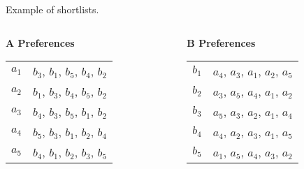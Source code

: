 \documentclass[aspectratio=169,xcolor=dvipsnames]{beamer}
\begin{document}
\begin{frame}{Example of shortlists.}
    \begin{columns}[t]
    \begin{column}{0.45\textwidth}
      \textbf{A Preferences}\\[6pt]
      \begin{tabular}{r@{: }l}
        $a_1$ & $b_3$, $b_1$, $b_5$, $b_4$, $b_2$ \\
        $a_2$ & $b_1$, $b_3$, $b_4$, $b_5$, $b_2$ \\
        $a_3$ & $b_4$, $b_3$, $b_5$, $b_1$, $b_2$ \\
        $a_4$ & $b_5$, $b_3$, $b_1$, $b_2$, $b_4$ \\
        $a_5$ & $b_4$, $b_1$, $b_2$, $b_3$, $b_5$ \\
      \end{tabular}
    \end{column}

    \begin{column}{0.45\textwidth}
      \textbf{B Preferences}\\[6pt]
      \begin{tabular}{r@{: }l}
        $b_1$ & $a_4$, $a_3$, $a_1$, $a_2$, $a_5$ \\
        $b_2$ & $a_3$, $a_5$, $a_4$, $a_1$, $a_2$ \\
        $b_3$ & $a_5$, $a_3$, $a_2$, $a_1$, $a_4$ \\
        $b_4$ & $a_4$, $a_2$, $a_3$, $a_1$, $a_5$ \\
        $b_5$ & $a_1$, $a_5$, $a_4$, $a_3$, $a_2$ \\
      \end{tabular}
    \end{column}
  \end{columns}
\end{frame}
\end{document}
